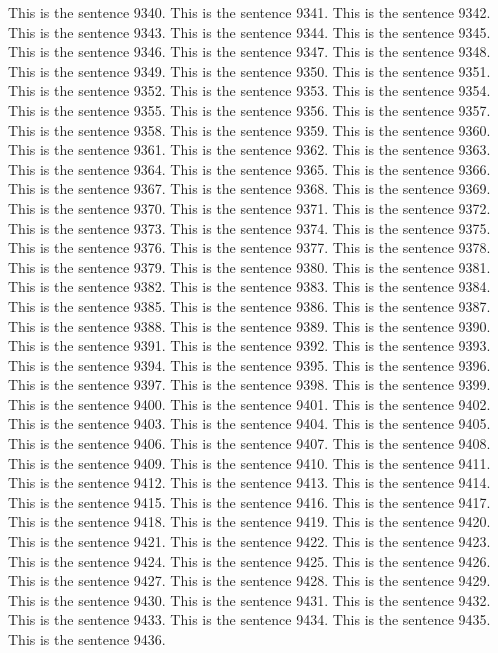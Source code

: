 \documentclass{article}
\begin{document}
This is the sentence 9340.
This is the sentence 9341.
This is the sentence 9342.
This is the sentence 9343.
This is the sentence 9344.
This is the sentence 9345.
This is the sentence 9346.
This is the sentence 9347.
This is the sentence 9348.
This is the sentence 9349.
This is the sentence 9350.
This is the sentence 9351.
This is the sentence 9352.
This is the sentence 9353.
This is the sentence 9354.
This is the sentence 9355.
This is the sentence 9356.
This is the sentence 9357.
This is the sentence 9358.
This is the sentence 9359.
This is the sentence 9360.
This is the sentence 9361.
This is the sentence 9362.
This is the sentence 9363.
This is the sentence 9364.
This is the sentence 9365.
This is the sentence 9366.
This is the sentence 9367.
This is the sentence 9368.
This is the sentence 9369.
This is the sentence 9370.
This is the sentence 9371.
This is the sentence 9372.
This is the sentence 9373.
This is the sentence 9374.
This is the sentence 9375.
This is the sentence 9376.
This is the sentence 9377.
This is the sentence 9378.
This is the sentence 9379.
This is the sentence 9380.
This is the sentence 9381.
This is the sentence 9382.
This is the sentence 9383.
This is the sentence 9384.
This is the sentence 9385.
This is the sentence 9386.
This is the sentence 9387.
This is the sentence 9388.
This is the sentence 9389.
This is the sentence 9390.
This is the sentence 9391.
This is the sentence 9392.
This is the sentence 9393.
This is the sentence 9394.
This is the sentence 9395.
This is the sentence 9396.
This is the sentence 9397.
This is the sentence 9398.
This is the sentence 9399.
This is the sentence 9400.
This is the sentence 9401.
This is the sentence 9402.
This is the sentence 9403.
This is the sentence 9404.
This is the sentence 9405.
This is the sentence 9406.
This is the sentence 9407.
This is the sentence 9408.
This is the sentence 9409.
This is the sentence 9410.
This is the sentence 9411.
This is the sentence 9412.
This is the sentence 9413.
This is the sentence 9414.
This is the sentence 9415.
This is the sentence 9416.
This is the sentence 9417.
This is the sentence 9418.
This is the sentence 9419.
This is the sentence 9420.
This is the sentence 9421.
This is the sentence 9422.
This is the sentence 9423.
This is the sentence 9424.
This is the sentence 9425.
This is the sentence 9426.
This is the sentence 9427.
This is the sentence 9428.
This is the sentence 9429.
This is the sentence 9430.
This is the sentence 9431.
This is the sentence 9432.
This is the sentence 9433.
This is the sentence 9434.
This is the sentence 9435.
This is the sentence 9436.
\end{document}
